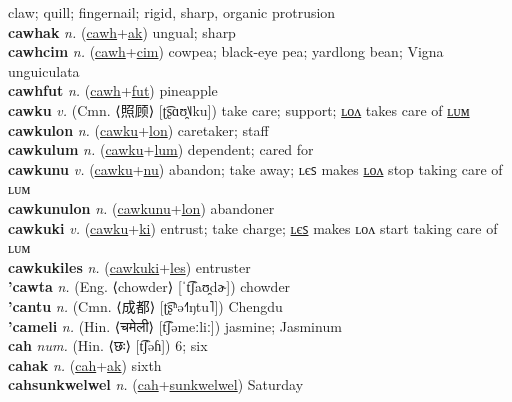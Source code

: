claw; quill; fingernail; rigid, sharp, organic protrusion \label{cawh} \\
\textbf{cawhak} \textit{n.} (\hyperref[cawh]{cawh}+\hyperref[ak]{ak})
ungual; sharp \label{cawhak} \\
\textbf{cawhcim} \textit{n.} (\hyperref[cawh]{cawh}+\hyperref[cim]{cim})
cowpea; black-eye pea; yardlong bean; Vigna unguiculata \label{cawhcim} \\
\textbf{cawhfut} \textit{n.} (\hyperref[cawh]{cawh}+\hyperref[fut]{fut})
pineapple \label{cawhfut} \\
\textbf{cawku} \textit{v.} (Cmn. ⟨照顾⟩ [ʈ͡ʂɑʊ̯˥˩ku])
take care; support; \hyperref[cawkulon]{ʟᴏᴧ} takes care of \hyperref[cawkulum]{ʟᴜᴍ} \label{cawku} \\
\textbf{cawkulon} \textit{n.} (\hyperref[cawku]{cawku}+\hyperref[lon]{lon})
caretaker; staff \label{cawkulon} \\
\textbf{cawkulum} \textit{n.} (\hyperref[cawku]{cawku}+\hyperref[lum]{lum})
dependent; cared for \label{cawkulum} \\
\textbf{cawkunu} \textit{v.} (\hyperref[cawku]{cawku}+\hyperref[nu]{nu})
abandon; take away; ʟєꜱ makes \hyperref[cawkunulon]{ʟᴏᴧ} stop taking care of ʟᴜᴍ \label{cawkunu} \\
\textbf{cawkunulon} \textit{n.} (\hyperref[cawkunu]{cawkunu}+\hyperref[lon]{lon})
abandoner \label{cawkunulon} \\
\textbf{cawkuki} \textit{v.} (\hyperref[cawku]{cawku}+\hyperref[ki]{ki})
entrust; take charge; \hyperref[cawkukiles]{ʟєꜱ} makes ʟᴏᴧ start taking care of ʟᴜᴍ \label{cawkuki} \\
\textbf{cawkukiles} \textit{n.} (\hyperref[cawkuki]{cawkuki}+\hyperref[les]{les})
entruster \label{cawkukiles} \\
\textbf{'cawta} \textit{n.} (Eng. ⟨chowder⟩ [ˈt͡ʃaʊ̯dɚ])
chowder \label{'cawta} \\
\textbf{'cantu} \textit{n.} (Cmn. ⟨成都⟩ [ʈ͡ʂʰə˧˥ŋtu˥])
Chengdu \label{'cantu} \\
\textbf{'cameli} \textit{n.} (Hin. ⟨चमेली⟩ [t͡ʃəmeːliː])
jasmine; Jasminum \label{'cameli} \\
\textbf{cah} \textit{num.} (Hin. ⟨छः⟩ [t͡ʃəɦ])
6; six \label{cah} \\
\textbf{cahak} \textit{n.} (\hyperref[cah]{cah}+\hyperref[ak]{ak})
sixth \label{cahak} \\
\textbf{cahsunkwelwel} \textit{n.} (\hyperref[cah]{cah}+\hyperref[sunkwelwel]{sunkwelwel})
Saturday \label{cahsunkwelwel} \\
